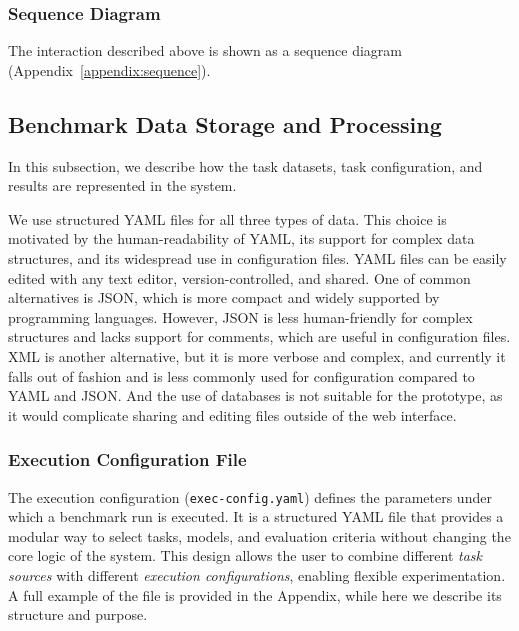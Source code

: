 \subsubsection{Sequence Diagram}

The interaction described above is shown as a sequence diagram (Appendix~\ref{appendix:sequence}).


\subsection{Benchmark Data Storage and Processing}

In this subsection, we describe how the task datasets, task configuration, and results are represented in the system.

We use structured YAML files for all three types of data.
This choice is motivated by the human-readability of YAML, its support for complex data structures, and its widespread use in configuration files.
YAML files can be easily edited with any text editor, version-controlled, and shared.
One of common alternatives is JSON, which is more compact and widely supported by programming languages.
However, JSON is less human-friendly for complex structures and lacks support for comments, which are useful in configuration files.
XML is another alternative, but it is more verbose and complex, and currently it falls out of fashion and is less commonly used for configuration compared to YAML and JSON.
And the use of databases is not suitable for the prototype, as it would complicate sharing and editing files outside of the web interface.

\subsubsection{Execution Configuration File}

The execution configuration (\texttt{exec-config.yaml}) defines the parameters under which a benchmark run is executed.
It is a structured YAML file that provides a modular way to select tasks, models, and evaluation criteria without changing the core logic of the system.
This design allows the user to combine different \emph{task sources} with different \emph{execution configurations}, enabling flexible experimentation.
A full example of the file is provided in the Appendix, while here we describe its structure and purpose.

